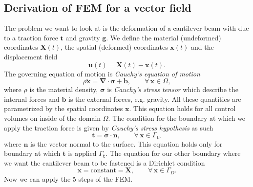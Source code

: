 \documentclass[acmtog]{acmart}
\begin{document}
\subsection{Derivation of FEM for a vector field}
The problem we want to look at is the deformation of a cantilever beam with due
to a traction force $\boldsymbol t$ and gravity $\boldsymbol g$. We define the
material (undeformed) coordinates $\boldsymbol X(t)$, the spatial (deformed)
coordinates $\boldsymbol x(t)$ and the displacement field
%
\begin{equation}
  \boldsymbol u (t) = \boldsymbol X(t) - \boldsymbol x(t).
\end{equation}
%
The governing equation of motion is \textit{Cauchy's equation of motion}
%
\begin{equation}
  \rho \ddot{\boldsymbol x} = \boldsymbol \nabla \cdot \boldsymbol \sigma + \boldsymbol b, \qquad \forall \, \boldsymbol x \in \Omega,
\end{equation}
%
where $\rho$ is the material density, $\boldsymbol \sigma$ is \textit{Cauchy's
  stress tensor} which describe the internal forces and $\mathbf b$ is the
external forces, e.g. gravity. All these quantities are parametrized by the
spatial coordinates $\boldsymbol x$. This equation holds for all control
volumes on inside of the domain $\Omega$. The condition for the boundary at
which we apply the traction force is given by \textit{Cauchy's stress
  hypothesis} as such
%
\begin{equation}
  \boldsymbol t = \boldsymbol \sigma \cdot \boldsymbol n, \qquad \forall  \, \boldsymbol x  \in \Gamma_{\boldsymbol t},
\end{equation}
%
where $\boldsymbol n$ is the vector normal to the surface. This equation holds
only for boundary at which $\boldsymbol t$ is applied $\Gamma_{\boldsymbol t}$.
The equation for our other boundary where we want the cantilever beam to be
fastened is a Dirichlet condition
%
\begin{equation}
  \boldsymbol x = \mathrm{constant} = \boldsymbol X, \qquad \forall \,\boldsymbol x \in \Gamma_D.
\end{equation}
%
Now we can apply the 5 steps of the FEM.
%
\end{document}
